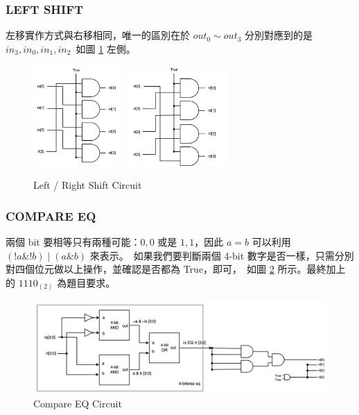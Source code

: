 \documentclass[10.5pt,compsoc,UTF8]{CjC}
\theoremstyle{mystyle}
\begin{document}
\subsubsection*{LEFT SHIFT}
左移實作方式與右移相同，唯一的區別在於 $out_0 \sim out_3$ 分別對應到的是 $in_3, in_0, in_1, in_2$\
如圖 \ref{fig:SHIFT} 左側。


\begin{figure}[htp]
  \centering
  \includegraphics[width=0.3\textwidth]{LSHIFT.png}
  \includegraphics[width=0.35\textwidth]{RSHIFT.png}
  \caption{Left / Right Shift Circuit}
  \label{fig:SHIFT}
\end{figure}

\subsubsection*{COMPARE EQ}
兩個 bit 要相等只有兩種可能：$0, 0$ 或是 $1, 1$，因此 $a = b$ 可以利用 $(!a \& !b) \mid (a \& b)$ 來表示。\ 
如果我們要判斷兩個 4-bit 數字是否一樣，只需分別對四個位元做以上操作，並確認是否都為 True，即可，\
如圖 \ref{fig:EQ} 所示。最終加上的 $1110_{(2)}$ 為題目要求。

\begin{figure}[htp]
  \centering
  \includegraphics[width=\textwidth]{EQ.png}
  \caption{Compare EQ Circuit}
  \label{fig:EQ}
\end{figure}
\end{document}
